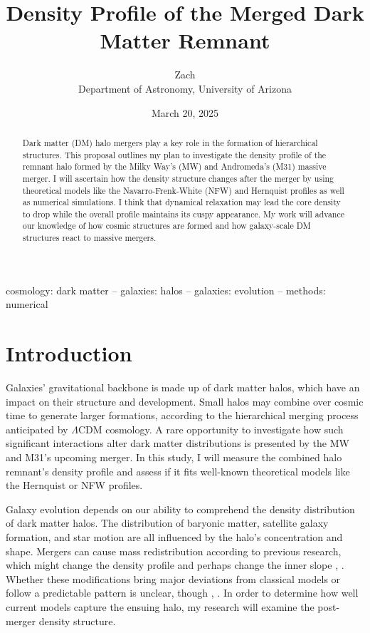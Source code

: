 \documentclass{mnras}
\title[Density Profile of Merged Dark Matter Remnant]{Density Profile of the Merged Dark Matter Remnant}
\author[Zach Harnist]{Zach\\Department of Astronomy, University of Arizona}
\date{March 20, 2025}
\begin{document}
\maketitle

\begin{abstract}
Dark matter (DM) halo mergers play a key role in the formation of hierarchical structures. 
This proposal outlines my plan to investigate the density profile of the remnant halo formed by the Milky Way's (MW) and Andromeda's (M31) massive merger. 
I will ascertain how the density structure changes after the merger by using theoretical models like the Navarro-Frenk-White (NFW) and Hernquist profiles as well as numerical simulations. 
I think that dynamical relaxation may lead the core density to drop while the overall profile maintains its cuspy appearance. 
My work will advance our knowledge of how cosmic structures are formed and how galaxy-scale DM structures react to massive mergers.
\end{abstract}

\begin{keywords}
cosmology: dark matter -- galaxies: halos -- galaxies: evolution -- methods: numerical
\end{keywords}

\section{Introduction}

Galaxies' gravitational backbone is made up of dark matter halos, which have an impact on their structure and development. Small halos may combine over cosmic time to generate larger formations, according to the hierarchical merging process anticipated by $\Lambda$CDM cosmology. A rare opportunity to investigate how such significant interactions alter dark matter distributions is presented by the MW and M31's upcoming merger. In this study, I will measure the combined halo remnant's density profile and assess if it fits well-known theoretical models like the Hernquist or NFW profiles.

Galaxy evolution depends on our ability to comprehend the density distribution of dark matter halos. The distribution of baryonic matter, satellite galaxy formation, and star motion are all influenced by the halo's concentration and shape. Mergers can cause mass redistribution according to previous research, which might change the density profile and perhaps change the inner slope \citep[Frenk \& White 2012]{Frenk2012}, \citep[Abadi et al. 2010]{Abadi2010}. Whether these modifications bring major deviations from classical models or follow a predictable pattern is unclear, though \citep[Drakos et al. 2019a]{Drakos2019a}, \citep[Drakos et al. 2019b]{Drakos2019b}. In order to determine how well current models capture the ensuing halo, my research will examine the post-merger density structure.
\end{document}
